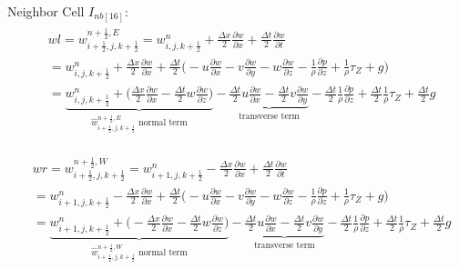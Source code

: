 \documentclass{article}
\numberwithin{equation}{subsection}
\begin{document}
Neighbor Cell $I_{nb[16]}$:
\begin{align}
\begin{split}
& wl = w_{i+\frac{1}{2},j,k+\frac{1}{2}}^{n+\frac{1}{2},E} = w_{i,j,k+\frac{1}{2}}^n + \frac{\Delta x}{2}\frac{\partial w}{\partial x} + \frac{\Delta t}{2}\frac{\partial w}{\partial t} \\
&= w_{i,j,k+\frac{1}{2}}^n + \frac{\Delta x}{2} \frac{\partial w}{\partial x} + \frac{\Delta t}{2} \Big( -u\frac{\partial w}{\partial x} -v\frac{\partial w}{\partial y} -w\frac{\partial w}{\partial z} - \frac{1}{\rho}\frac{\partial p}{\partial z} +\frac{1}{\rho}\tau_Z + g\Big) \\
&= \underbrace{w_{i,j,k+\frac{1}{2}}^n + \Big(\frac{\Delta x}{2}\frac{\partial w}{\partial x} - \frac{\Delta t}{2} w\frac{\partial w}{\partial z}\Big)}_\text{$\widehat{w}_{i+\frac{1}{2},j,k+\frac{1}{2}}^{n+\frac{1}{2},E}$ normal term} -\underbrace{\frac{\Delta t}{2}u\frac{\partial w}{\partial x} - \frac{\Delta t}{2}v\frac{\partial w}{\partial y}}_\text{transverse term} - \frac{\Delta t}{2}\frac{1}{\rho}\frac{\partial p}{\partial z} + \frac{\Delta t}{2}\frac{1}{\rho}\tau_Z + \frac{\Delta t}{2}g
\end{split}
\end{align}

\begin{align}
\begin{split}
& wr = w_{i+\frac{1}{2},j,k+\frac{1}{2}}^{n+\frac{1}{2},W} = w_{i+1,j,k+\frac{1}{2}}^n - \frac{\Delta x}{2}\frac{\partial w}{\partial x} + \frac{\Delta t}{2}\frac{\partial w}{\partial t} \\
&= w_{i+1,j,k+\frac{1}{2}}^n - \frac{\Delta x}{2} \frac{\partial w}{\partial x} + \frac{\Delta t}{2} \Big( -u\frac{\partial w}{\partial x} -v\frac{\partial w}{\partial y} -w\frac{\partial w}{\partial z} - \frac{1}{\rho}\frac{\partial p}{\partial z} +\frac{1}{\rho}\tau_Z + g\Big) \\
&= \underbrace{w_{i+1,j,k+\frac{1}{2}}^n + \Big(-\frac{\Delta x}{2}\frac{\partial w}{\partial x} - \frac{\Delta t}{2} w\frac{\partial w}{\partial z}\Big)}_\text{$\widehat{w}_{i+\frac{1}{2},j,k+\frac{1}{2}}^{n+\frac{1}{2},W}$ normal term} -\underbrace{\frac{\Delta t}{2}u\frac{\partial w}{\partial x} - \frac{\Delta t}{2}v\frac{\partial w}{\partial y}}_\text{transverse term} - \frac{\Delta t}{2}\frac{1}{\rho}\frac{\partial p}{\partial z} + \frac{\Delta t}{2}\frac{1}{\rho}\tau_Z + \frac{\Delta t}{2}g
\end{split}
\end{align}
\end{document}
